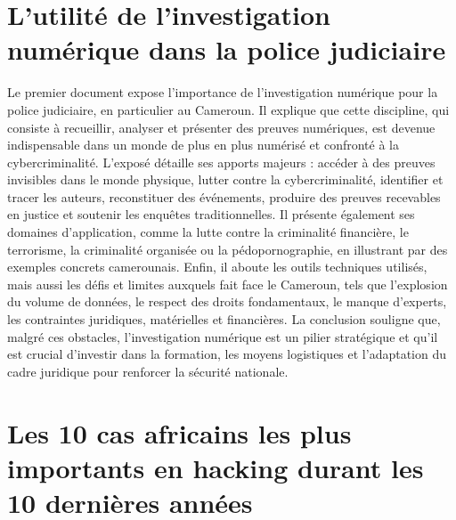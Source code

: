 \documentclass[11pt,a4paper]{article}
\begin{document}
	\section{ L’utilité de l'investigation numérique dans la police judiciaire}
	\vspace{0.5cm}
	Le premier document expose l'importance de l’investigation numérique pour la police judiciaire, en particulier au Cameroun. Il explique que cette discipline, qui consiste à recueillir, analyser et présenter des preuves numériques, est devenue indispensable dans un monde de plus en plus numérisé et confronté à la cybercriminalité. L’exposé détaille ses apports majeurs : accéder à des preuves invisibles dans le monde physique, lutter contre la cybercriminalité, identifier et tracer les auteurs, reconstituer des événements, produire des preuves recevables en justice et soutenir les enquêtes traditionnelles. Il présente également ses domaines d’application, comme la lutte contre la criminalité financière, le terrorisme, la criminalité organisée ou la pédopornographie, en illustrant par des exemples concrets camerounais. Enfin, il aboute les outils techniques utilisés, mais aussi les défis et limites auxquels fait face le Cameroun, tels que l’explosion du volume de données, le respect des droits fondamentaux, le manque d’experts, les contraintes juridiques, matérielles et financières. La conclusion souligne que, malgré ces obstacles, l’investigation numérique est un pilier stratégique et qu’il est crucial d’investir dans la formation, les moyens logistiques et l’adaptation du cadre juridique pour renforcer la sécurité nationale.
	

	\section{ Les 10 cas africains les plus importants en hacking durant les 10 dernières années }
	\vspace{0.5cm}
	
\end{document}
